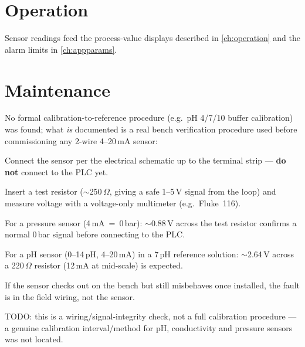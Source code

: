 \documentclass[a4paper,11pt,twoside,openright,numbers=noenddot]{scrreprt}
\begin{document}
\section{Operation}
Sensor readings feed the process-value displays described in
\cref{ch:operation} and the alarm limits in \cref{ch:appparams}.

\section{Maintenance}
\label{sec:sensorcal}
No formal calibration-to-reference procedure (e.g.\ pH 4/7/10 buffer
calibration) was found; what \emph{is} documented is a real bench
verification procedure used before commissioning any 2-wire 4--20\,mA
sensor:
\begin{procedure}
\item Connect the sensor per the electrical schematic up to the terminal
  strip --- \textbf{do not} connect to the PLC yet.
\item Insert a test resistor ($\sim$250\,$\Omega$, giving a safe 1--5\,V
  signal from the loop) and measure voltage with a voltage-only
  multimeter (e.g.\ Fluke~116).
\item For a pressure sensor (4\,mA~=~0\,bar): $\sim$0.88\,V across the test
  resistor confirms a normal 0\,bar signal before connecting to the PLC.
\item For a pH sensor (0--14\,pH, 4--20\,mA) in a 7\,pH reference solution:
  $\sim$2.64\,V across a 220\,$\Omega$ resistor (12\,mA at mid-scale) is
  expected.
\item If the sensor checks out on the bench but still misbehaves once
  installed, the fault is in the field wiring, not the sensor.
\end{procedure}
TODO: this is a wiring/signal-integrity check, not a full calibration
procedure --- a genuine calibration interval/method for pH, conductivity
and pressure sensors was not located.
\end{document}
